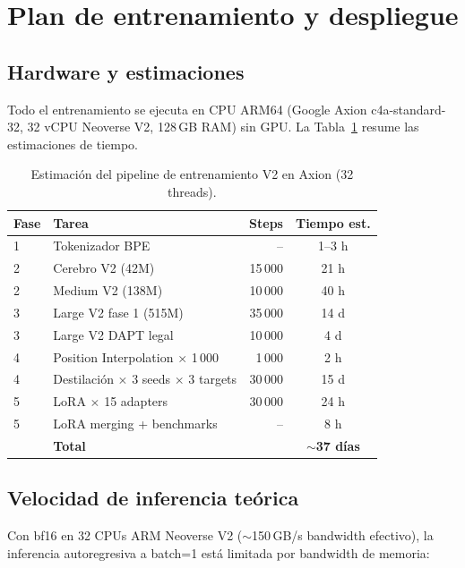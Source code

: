 \documentclass[11pt,a4paper]{article}
\begin{document}
\section{Plan de entrenamiento y despliegue}
\label{sec:training}

\subsection{Hardware y estimaciones}

Todo el entrenamiento se ejecuta en CPU ARM64 (Google Axion c4a-standard-32,
32 vCPU Neoverse V2, 128\,GB RAM) sin GPU. La Tabla~\ref{tab:timeline} resume
las estimaciones de tiempo.

\begin{table}[h]
\centering
\caption{Estimación del pipeline de entrenamiento V2 en Axion (32 threads).}
\label{tab:timeline}
\begin{tabular}{llrc}
\toprule
\textbf{Fase} & \textbf{Tarea} & \textbf{Steps} & \textbf{Tiempo est.} \\
\midrule
1 & Tokenizador BPE  & -- & 1--3 h \\
2 & Cerebro V2 (42M) & 15\,000 & 21 h \\
2 & Medium V2 (138M) & 10\,000 & 40 h \\
3 & Large V2 fase 1 (515M) & 35\,000 & 14 d \\
3 & Large V2 DAPT legal & 10\,000 & 4 d \\
4 & Position Interpolation $\times$ 1\,000 & 1\,000 & 2 h \\
4 & Destilación $\times$ 3 seeds $\times$ 3 targets & 30\,000 & 15 d \\
5 & LoRA $\times$ 15 adapters & 30\,000 & 24 h \\
5 & LoRA merging + benchmarks & -- & 8 h \\
\midrule
  & \textbf{Total} & & $\sim$\textbf{37 días} \\
\bottomrule
\end{tabular}
\end{table}

\subsection{Velocidad de inferencia teórica}

Con bf16 en 32 CPUs ARM Neoverse V2 ($\sim$150\,GB/s bandwidth efectivo), la
inferencia autoregresiva a batch=1 está limitada por bandwidth de memoria:
\end{document}
